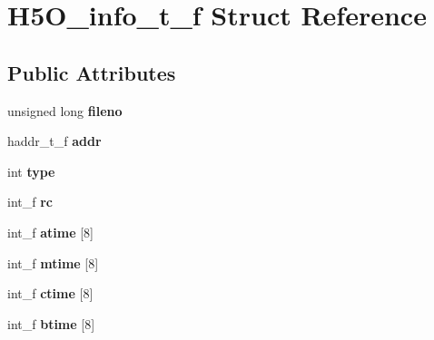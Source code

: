 \hypertarget{struct_h5_o__info__t__f}{}\section{H5\+O\+\_\+info\+\_\+t\+\_\+f Struct Reference}
\label{struct_h5_o__info__t__f}
\subsection*{Public Attributes}
\begin{DoxyCompactItemize}
\item 
\mbox{\label{struct_h5_o__info__t__f_ad8516a589ff1d28c98cd52dc161de8ea}} 
unsigned long {\bfseries fileno}
\item 
\mbox{\label{struct_h5_o__info__t__f_ab6a7400d8974ad4499a3f6aa1b263f59}} 
haddr\+\_\+t\+\_\+f {\bfseries addr}
\item 
\mbox{\label{struct_h5_o__info__t__f_ab5b403257c18a7d5f2256826065b1ba7}} 
int {\bfseries type}
\item 
\mbox{\label{struct_h5_o__info__t__f_ae5b2f9110cc801a39ab7567043887c5e}} 
int\+\_\+f {\bfseries rc}
\item 
\mbox{\label{struct_h5_o__info__t__f_a9f9e9eb7536bf08e04b386e6c937644b}} 
int\+\_\+f {\bfseries atime} \mbox{[}8\mbox{]}
\item 
\mbox{\label{struct_h5_o__info__t__f_acf000342224bf341d230a44df59d368b}} 
int\+\_\+f {\bfseries mtime} \mbox{[}8\mbox{]}
\item 
\mbox{\label{struct_h5_o__info__t__f_a3f9872619a39dbc539bb7fc7c8286c07}} 
int\+\_\+f {\bfseries ctime} \mbox{[}8\mbox{]}
\item 
\mbox{\label{struct_h5_o__info__t__f_a797b454e6957d5b9333b452a2ab2eb15}} 
int\+\_\+f {\bfseries btime} \mbox{[}8\mbox{]}
\item 
\mbox{\label{struct_h5_o__info__t__f_a595f84c7b514e4abcba7c51221bc0deb}} 

\end{DoxyCompactItemize}
